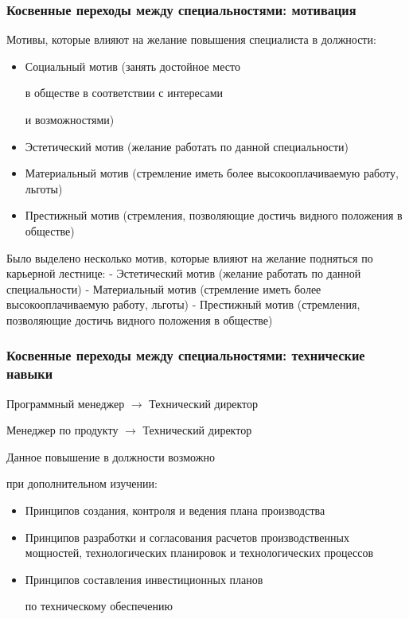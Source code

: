 \documentclass{../industrial-development}
\begin{document}
\begin{frame} \frametitle{Косвенные переходы между специальностями: мотивация }

 \begin{block}{}
Мотивы, которые влияют на желание повышения специалиста в должности:
  \end{block}
\begin{itemize}
\item Социальный мотив (занять достойное место 

в обществе в соответствии с интересами 

и возможностями)
\item Эстетический мотив (желание работать по данной специальности)
\item Материальный мотив (стремление иметь более высокооплачиваемую работу, льготы) 
\item Престижный мотив (стремления, позволяющие достичь видного положения в обществе)
  \end{itemize}
\end{frame}

\lecturenotes

Было выделено несколько мотив, которые влияют на желание подняться по карьерной лестнице:
- Эстетический мотив (желание работать по данной специальности)
- Материальный мотив (стремление иметь более высокооплачиваемую работу, льготы) 
- Престижный мотив (стремления, позволяющие достичь видного положения в обществе)



\begin{frame} \frametitle{Косвенные переходы между специальностями: технические навыки}

\begin{block}{Программный менеджер $\rightarrow$ Технический директор  

Менеджер по продукту $\rightarrow$ Технический директор }

Данное повышение в должности возможно 

при дополнительном изучении:
  \end{block}
\begin{itemize}
  \item Принципов создания, контроля и ведения плана производства
  \item Принципов разработки и согласования расчетов производственных мощностей, технологических планировок и технологических процессов
\item Принципов составления инвестиционных планов 

по техническому обеспечению
  \end{itemize}
\end{frame}
\end{document}
